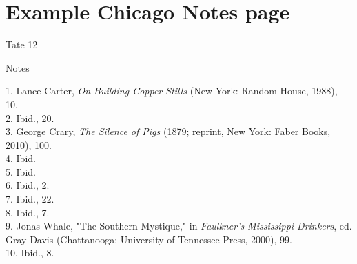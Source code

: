 \newpage
\section{Example Chicago Notes page} 

\begin{tcolorbox}[enhanced,width=4.2in,left=.3in, right=.3in,
   drop fuzzy shadow southeast,
    boxrule=0.4pt,sharp corners,colframe=black!80!black,colback=white!10]

\medskip

{\scriptsize \begin{flushright} Tate 12 \end{flushright}
\begin{singlespacing}

\begin{center} Notes \end{center}

\hspace{2em}1. Lance Carter, \emph{On Building Copper Stills} (New York: Random House, 1988), 10.\\

\hspace{2em}2. Ibid., 20.\\

\hspace{2em}3. George Crary, \emph{The Silence of Pigs} (1879; reprint, New York: Faber Books, 2010), 100.\\

\hspace{2em}4. Ibid.\\

\hspace{2em}5. Ibid.\\

\hspace{2em}6. Ibid., 2.\\

\hspace{2em}7. Ibid., 22.\\

\hspace{2em}8. Ibid., 7.\\ 

\hspace{2em}9. Jonas Whale, "The Southern Mystique," in \emph{Faulkner's Mississippi Drinkers}, ed. Gray Davis (Chattanooga: University of Tennessee Press, 2000), 99.\\

\hspace{2em}10. Ibid., 8.\\


\end{singlespacing}}
\end{tcolorbox}

